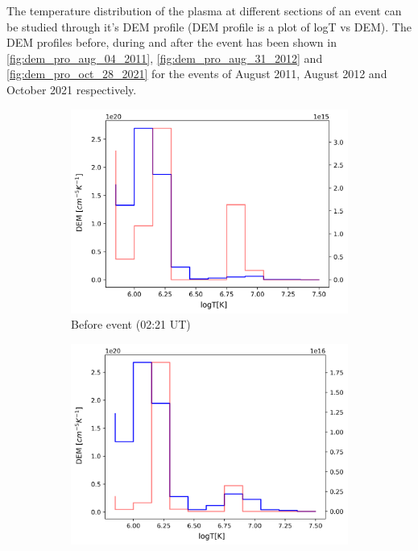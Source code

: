The temperature distribution of the plasma at different sections of an event can be studied through it's DEM profile (DEM profile is a plot of logT vs DEM). The DEM profiles before, during and after the event has been shown in \cref{fig:dem_pro_aug_04_2011}, \cref{fig:dem_pro_aug_31_2012} and \cref{fig:dem_pro_oct_28_2021} for the events of  August 2011,  August 2012 and  October 2021 respectively.

\begin{figure}[h!]

    \begin{subfigure}[b]{0.3\textwidth}
        \centering
        \includegraphics[width=\textwidth]{images/dem_profile_before_event_2011_aug_04.png}
        \caption{Before event (02:21 UT)}
    \end{subfigure}
    \hfill
    \begin{subfigure}[b]{0.3\textwidth}
        \centering
        \includegraphics[width=\textwidth]{images/dem_profile_during_event_2011_aug_04.png}

\end{subfigure}
\end{figure}
